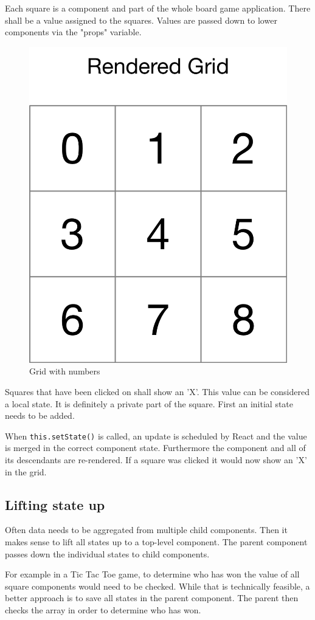 

Each square is a component and part of the whole board game application.
There shall be a value assigned to the squares. Values are passed down to lower components via the 
"props" variable. 



\begin{figure}[H]
	\centering
	\includegraphics[width=0.3\linewidth]{bilder/grundlagen/GameGrid.png}
	\caption{Grid with numbers}
	\label{fig:Grid}
\end{figure}

Squares that have been clicked on shall show an 'X'. This value can be considered a local state.
It is definitely a private part of the square. First an initial state needs to be added.



When \texttt{this.setState()} is called, an update is scheduled by React and the value is merged in the correct component state. Furthermore the component and all of its descendants are re-rendered. If a square was clicked it would now show an 'X' in the grid.

\subsection{Lifting state up}

Often data needs to be aggregated from multiple child components. 
Then it makes sense to lift all states up to a top-level component. 
The parent component  passes down the individual states to child components.

For example in a Tic Tac Toe game, to determine who has won 
the value of all square components would need to be checked. 
While that is technically feasible, a better approach is to save all states in the parent component.
The parent then checks the array in order to determine who has won.

